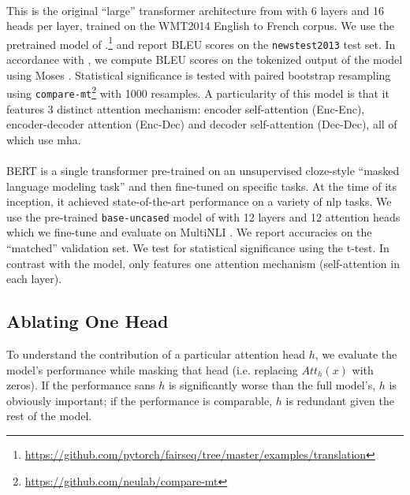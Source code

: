 \paragraph{\tfwmt{}} This is the original ``large'' transformer architecture from \citealt{vaswani2017attention} with 6 layers and 16 heads per layer, trained on the WMT2014 English to French corpus. We use the pretrained model of \citealt{ott2018scaling}.\footnote{\url{https://github.com/pytorch/fairseq/tree/master/examples/translation}} and report BLEU scores on the \texttt{newstest2013} test set. In accordance with \citealt{ott2018scaling}, we compute BLEU scores on the tokenized output of the model using Moses \citep{koehn2007moses}. Statistical significance is tested with paired bootstrap resampling \citep{koehn2004statistical} using \texttt{compare-mt}\footnote{\url{https://github.com/neulab/compare-mt}} \citep{neubig2019comparemt} with 1000 resamples. A particularity of this model is that it features 3 distinct attention mechanism: encoder self-attention (Enc-Enc), encoder-decoder attention (Enc-Dec) and decoder self-attention (Dec-Dec), all of which use \ac{mha}.

\paragraph{\bertmnli{}} BERT \citep{devlin2018bert} is a single transformer pre-trained on an unsupervised cloze-style ``masked language modeling task'' and then fine-tuned on specific tasks. At the time of its inception, it achieved state-of-the-art performance on a variety of \ac{nlp} tasks. We use the pre-trained \texttt{base-uncased} model of \citealt{devlin2018bert} with 12 layers and 12 attention heads which we fine-tune and evaluate on MultiNLI \citep{williams18multinli}. We report accuracies on the ``matched'' validation set. We test for statistical significance using the t-test. In contrast with the \tfwmt{} model, \bertmnli{} only features one attention mechanism (self-attention in each layer).

\subsection{Ablating One Head}
\label{sec:ablating_one}

To understand the contribution of a particular attention head $h$, we evaluate the model's performance while masking that head (i.e. replacing $Att_h (x)$ with zeros). If the performance sans $h$ is significantly worse than the full model's, $h$ is obviously important; if the performance is comparable, $h$ is redundant given the rest of the model.

